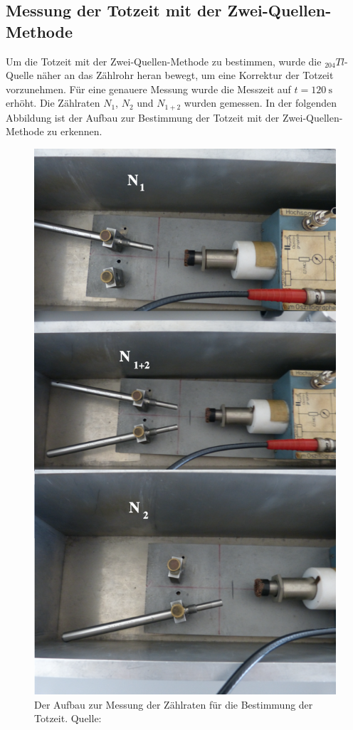 \subsection{Messung der Totzeit mit der Zwei-Quellen-Methode}
  Um die Totzeit mit der Zwei-Quellen-Methode zu bestimmen, wurde die $_{204}Tl$-Quelle näher an das
  Zählrohr heran bewegt, um eine Korrektur der Totzeit vorzunehmen. Für eine genauere Messung wurde
  die Messzeit auf $t = \SI{120}{\second}$ erhöht. Die Zählraten $N_{1}$, $N_{2}$ und $N_{1+2}$ wurden
  gemessen. In der folgenden Abbildung ist der Aufbau zur Bestimmung der Totzeit mit der Zwei-Quellen-
  Methode zu erkennen.
  \begin{figure}[H]
    \centering
      \includegraphics[scale=0.3]{content/totzeit2.png}
      \caption{Der Aufbau zur Messung der Zählraten für die Bestimmung der Totzeit. Quelle:\cite{AP02}}
      \label{fig:totzeit2}
  \end{figure}
